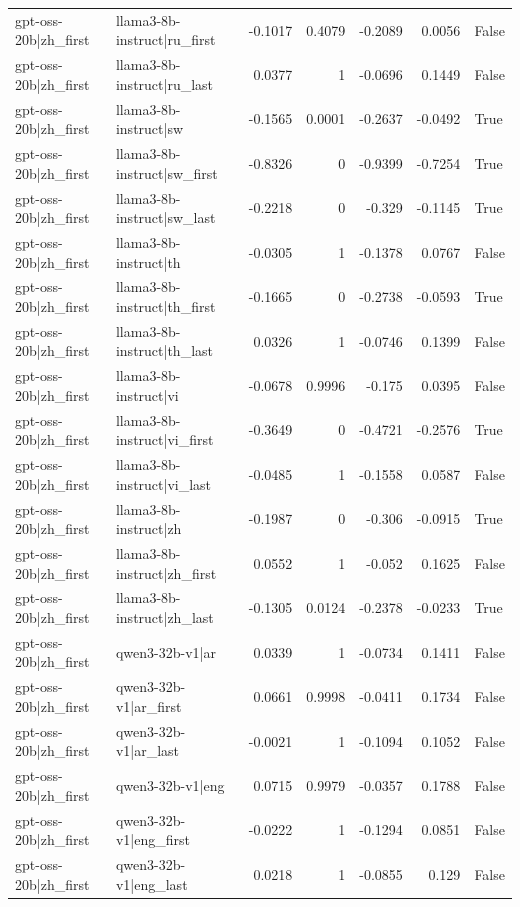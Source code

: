 \begin{table}
\begin{tabular}{l l r r r r l}
gpt-oss-20b|zh_first & llama3-8b-instruct|ru_first & -0.1017 & 0.4079 & -0.2089 & 0.0056 & False \\
gpt-oss-20b|zh_first & llama3-8b-instruct|ru_last & 0.0377 & 1 & -0.0696 & 0.1449 & False \\
gpt-oss-20b|zh_first & llama3-8b-instruct|sw & -0.1565 & 0.0001 & -0.2637 & -0.0492 & True \\
gpt-oss-20b|zh_first & llama3-8b-instruct|sw_first & -0.8326 & 0 & -0.9399 & -0.7254 & True \\
gpt-oss-20b|zh_first & llama3-8b-instruct|sw_last & -0.2218 & 0 & -0.329 & -0.1145 & True \\
gpt-oss-20b|zh_first & llama3-8b-instruct|th & -0.0305 & 1 & -0.1378 & 0.0767 & False \\
gpt-oss-20b|zh_first & llama3-8b-instruct|th_first & -0.1665 & 0 & -0.2738 & -0.0593 & True \\
gpt-oss-20b|zh_first & llama3-8b-instruct|th_last & 0.0326 & 1 & -0.0746 & 0.1399 & False \\
gpt-oss-20b|zh_first & llama3-8b-instruct|vi & -0.0678 & 0.9996 & -0.175 & 0.0395 & False \\
gpt-oss-20b|zh_first & llama3-8b-instruct|vi_first & -0.3649 & 0 & -0.4721 & -0.2576 & True \\
gpt-oss-20b|zh_first & llama3-8b-instruct|vi_last & -0.0485 & 1 & -0.1558 & 0.0587 & False \\
gpt-oss-20b|zh_first & llama3-8b-instruct|zh & -0.1987 & 0 & -0.306 & -0.0915 & True \\
gpt-oss-20b|zh_first & llama3-8b-instruct|zh_first & 0.0552 & 1 & -0.052 & 0.1625 & False \\
gpt-oss-20b|zh_first & llama3-8b-instruct|zh_last & -0.1305 & 0.0124 & -0.2378 & -0.0233 & True \\
gpt-oss-20b|zh_first & qwen3-32b-v1|ar & 0.0339 & 1 & -0.0734 & 0.1411 & False \\
gpt-oss-20b|zh_first & qwen3-32b-v1|ar_first & 0.0661 & 0.9998 & -0.0411 & 0.1734 & False \\
gpt-oss-20b|zh_first & qwen3-32b-v1|ar_last & -0.0021 & 1 & -0.1094 & 0.1052 & False \\
gpt-oss-20b|zh_first & qwen3-32b-v1|eng & 0.0715 & 0.9979 & -0.0357 & 0.1788 & False \\
gpt-oss-20b|zh_first & qwen3-32b-v1|eng_first & -0.0222 & 1 & -0.1294 & 0.0851 & False \\
gpt-oss-20b|zh_first & qwen3-32b-v1|eng_last & 0.0218 & 1 & -0.0855 & 0.129 & False \\

\end{tabular}
\end{table}
